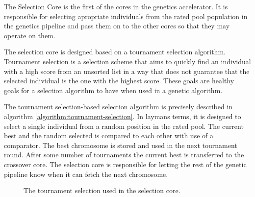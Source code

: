 The Selection Core is the first of the cores in the genetics accelerator.
It is responsible for selecting apropriate individuals from the rated pool population in the genetics pipeline and pass them on to the other cores so that they may operate on them.

The selection core is designed based on a tournament selection algorithm.
Tournament selection is a selection scheme that aims to quickly find an individual with a high score from an unsorted list in a way that does not guarantee that the selected individual is the one with the highest score.
These goals are healthy goals for a selection algorithm to have when used in a genetic algorithm.

The tournament selection-based selection algorithm is precisely described in algorithm \vref{algorithm:tournament-selection}.
In laymans terms, it is designed to select a single individual from a random position in the rated pool.
The current best and the random selected is compared to each other with use of a comparator.
The best chromosome is stored and used in the next tournament round.
After some number of tournaments the current best is transferred to the crossover core.
The selection core is responsible for letting the rest of the genetic pipeline know when it can fetch the next chromosome. 

\begin{figure}[H]
\begin{algorithm}[H]
\SetAlgoLined
\DontPrintSemicolon
{}
\caption{The tournament selection used in the selection core.}
\label{algorithm:tournament-selection}
\end{algorithm}
\end{figure}

